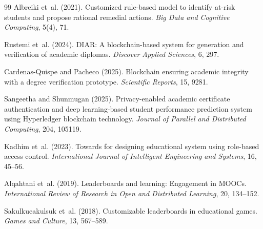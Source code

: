 \documentclass[12pt]{article}
\begin{document}
\begin{thebibliography}{99}
 Albreiki et~al. (2021). Customized rule-based model to identify at-risk students and propose rational remedial actions. \textit{Big Data and Cognitive Computing}, 5(4), 71.

 Rustemi et~al. (2024). DIAR: A blockchain-based system for generation and verification of academic diplomas. \textit{Discover Applied Sciences}, 6, 297.

 Cardenas-Quispe and Pacheco (2025). Blockchain ensuring academic integrity with a degree verification prototype. \textit{Scientific Reports}, 15, 9281.

 Sangeetha and Shunmugan (2025). Privacy-enabled academic certificate authentication and deep learning-based student performance prediction system using Hyperledger blockchain technology. \textit{Journal of Parallel and Distributed Computing}, 204, 105119.

 Kadhim et~al. (2023). Towards for designing educational system using role-based access control. \textit{International Journal of Intelligent Engineering and Systems}, 16, 45--56.

 Alqahtani et~al. (2019). Leaderboards and learning: Engagement in MOOCs. \textit{International Review of Research in Open and Distributed Learning}, 20, 134--152.

 Sakulkueakulsuk et~al. (2018). Customizable leaderboards in educational games. \textit{Games and Culture}, 13, 567--589.

\end{thebibliography}
\end{document}
